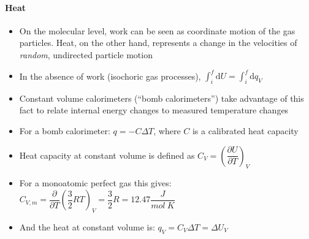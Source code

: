 \documentclass[12pt, openany, letterpaper]{memoir}
\begin{document}
\paragraph{Heat}
\begin{itemize}
	\item On the molecular level, work can be seen as coordinate motion of the gas particles. Heat, on the other hand, represents a change in the velocities of \emph{random}, undirected particle motion
	\item In the absence of work (isochoric gas processes), $\displaystyle\int_i^f\mathrm{d}U = \displaystyle\int_i^f\mathrm{d}q_V$
	\item Constant volume calorimeters (``bomb calorimeters'') take advantage of this fact to relate internal energy changes to measured temperature changes
	\item For a bomb calorimeter: $q=-C\Delta T$, where $C$ is a calibrated heat capacity
	\item Heat capacity at constant volume is defined as $C_V=\left(\dfrac{\partial U}{\partial T}\right)_V$
	\item For a monoatomic perfect gas this gives: $C_{V,m}=\dfrac{\partial}{\partial T}\left(\dfrac{3}{2}RT\right)_V = \dfrac{3}{2}R = 12.47\dfrac{J}{mol~K}$
	\item And the heat at constant volume is: $q_V=C_V\Delta T = \Delta U_V$
\end{itemize}
\end{document}
